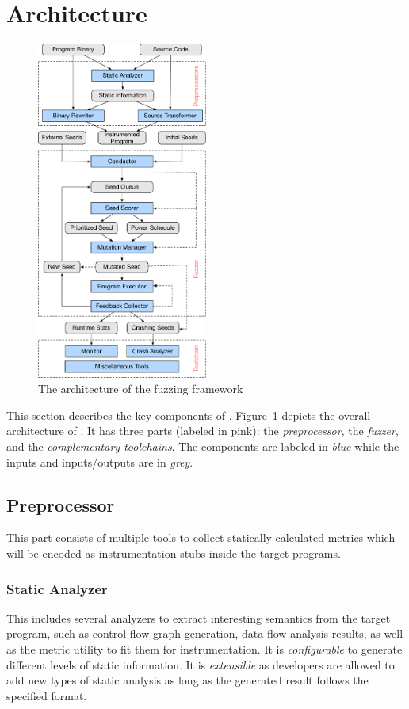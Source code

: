 \section{Architecture}\label{sec:details}

\begin{figure}[ht]
	\centering
	\includegraphics[width=0.5\textwidth]{res/fot/FOT_overview}
	\caption{The architecture of the {\FOT} fuzzing framework}
	\label{fig:fot_workflow}
\end{figure}

This section describes the key components of {\FOT}.
Figure~\ref{fig:fot_workflow} depicts the overall architecture of {\FOT}.
It has three parts (labeled in pink): the \emph{preprocessor}, the \emph{fuzzer}, and the \emph{complementary toolchains}.
The components are labeled in \emph{blue} while the inputs and inputs/outputs are in \emph{grey}.


\subsection{Preprocessor}
This part consists of multiple tools to collect statically calculated metrics which will be encoded as instrumentation stubs inside the target programs.


\subsubsection{Static Analyzer}\label{sec:static_analysis}
This includes several analyzers to extract interesting semantics from the target program, such as control flow graph generation, data flow analysis results, as well as the metric utility to fit them for instrumentation.
It is \textit{configurable} to generate different levels of static information. It is \textit{extensible} as developers are allowed to add new types of static analysis as long as the generated result follows the specified format.



